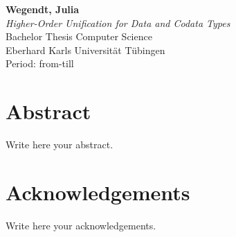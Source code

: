 \documentclass[twoside,12pt,a4paper]{article}
\begin{document}
\thispagestyle{empty}
\vspace*{\fill}
\begin{minipage}{11.2cm}
\textbf{Wegendt, Julia}\\
\emph{Higher-Order Unification for Data and Codata Types}\\ Bachelor Thesis Computer Science\\
Eberhard Karls Universität Tübingen\\
Period: from-till
\end{minipage}
\newpage


\setcounter{page}{1}


\section*{Abstract}

Write here your abstract.
\newpage
\section*{Acknowledgements}

Write here your acknowledgements.

\cleardoublepage


\renewcommand{\baselinestretch}{1.3}
\small\normalsize

\tableofcontents

\renewcommand{\baselinestretch}{1}
\small\normalsize

\listoftheorems

\cleardoublepage


\setcounter{page}{1}
\end{document}
